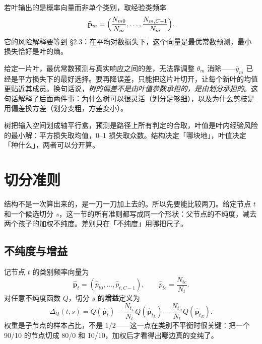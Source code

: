 \documentclass[11pt,a4paper,fontset=windows,zihao=-4]{ctexart}
\newcommand{\bp}{\mathbf{p}}
\begin{document}
若叶输出的是概率向量而非单个类别，取经验类频率
\begin{equation}
  \widehat{\bp}_m=\Bigl(\frac{N_{m0}}{N_m},\dots,\frac{N_{m,C-1}}{N_m}\Bigr).
  \label{eq:leafprob}
\end{equation}
它的风险解释要等到 §2.3：在平均对数损失下，这个向量是最优常数预测，最小损失恰好是叶的熵。

\begin{add}
给定一片叶，最优常数预测与真实响应之间的差，无法靠调整 $\theta_m$ 消除——$\bar y_m$ 已经是平方损失下的最好选择。要再降误差，只能把这片叶切开，让每个新叶的均值更贴近其成员。换句话说，\emph{树的偏差不是由叶值参数承担的，是由划分承担的}。这句话解释了后面两件事：为什么树可以很灵活（划分足够细），以及为什么剪枝是用偏差换方差（划分变粗，方差变小）。
\end{add}

\begin{keybox}[这一节的三句话]
树把输入空间划成轴平行盒，预测是路径上所有判定的合取，叶值是叶内经验风险的最小解：平方损失取均值，0--1 损失取众数。结构决定「哪块地」，叶值决定「种什么」，两者可以分开算。
\end{keybox}


\section{切分准则}

结构不是一次算出来的，是一刀一刀加上去的。所以先要能比较两刀。给定节点 $t$ 和一个候选切分 $s$，这一节的所有准则都写成同一个形状：父节点的不纯度，减去两个孩子的加权不纯度。差别只在「不纯度」用哪把尺子。

\subsection{不纯度与增益}

记节点 $t$ 的类别频率向量为
\[
  \widehat{\bp}_t=(\widehat p_{t0},\dots,\widehat p_{t,C-1}),
  \qquad \widehat p_{tc}=\frac{N_{tc}}{N_t}.
\]
对任意不纯度函数 $Q$，切分 $s$ 的\textbf{增益}定义为
\begin{equation}
  \Delta_Q(t,s)
  =Q(\widehat{\bp}_t)
   -\frac{N_{t_L}}{N_t}Q(\widehat{\bp}_{t_L})
   -\frac{N_{t_R}}{N_t}Q(\widehat{\bp}_{t_R}).
  \label{eq:gain}
\end{equation}
权重是子节点的样本占比，不是 $1/2$——这一点在类别不平衡时很关键：把一个 90/10 的节点切成 80/0 和 10/10，加权后才看得出哪边真的变纯了。
\end{document}
